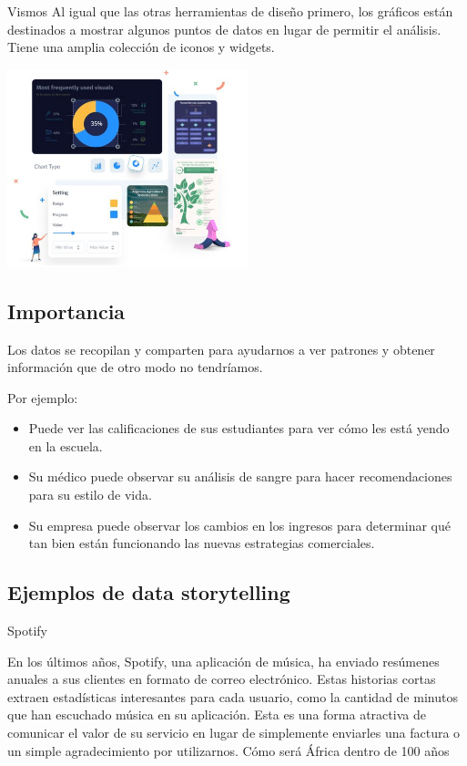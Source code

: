 \documentclass[twoside,twocolumn]{article}
\begin{document}
Vismos
Al igual que las otras herramientas de diseño primero, los gráficos están destinados a mostrar algunos puntos de datos en lugar de permitir el análisis. Tiene una amplia colección de iconos y widgets. 

\includegraphics[width=7cm]{imagenes/img9.png}

\subsection{Importancia}

Los datos se recopilan y comparten para ayudarnos a ver patrones y obtener información que de otro modo no tendríamos.

Por ejemplo:
\begin{itemize}
    \item Puede ver las calificaciones de sus estudiantes para ver cómo les está yendo en la escuela.
    \item Su médico puede observar su análisis de sangre para hacer recomendaciones para su estilo de vida.
    \item Su empresa puede observar los cambios en los ingresos para determinar qué tan bien están funcionando las nuevas estrategias comerciales.
    
\end{itemize}

\subsection{Ejemplos de  data storytelling }

Spotify

En los últimos años, Spotify, una aplicación de música, ha enviado resúmenes anuales a sus clientes en formato de correo electrónico. Estas historias cortas extraen estadísticas interesantes para cada usuario, como la cantidad de minutos que han escuchado música en su aplicación. Esta es una forma atractiva de comunicar el valor de su servicio en lugar de simplemente enviarles una factura o un simple agradecimiento por utilizarnos.
Cómo será África dentro de 100 años
\end{document}
